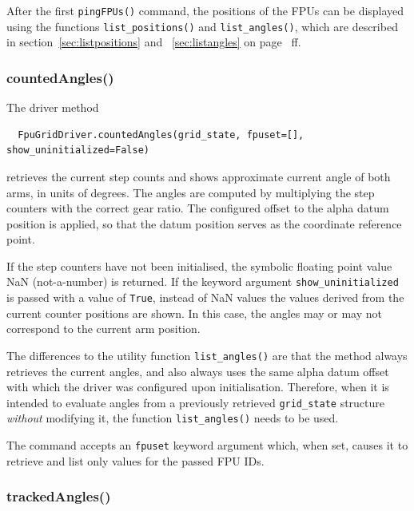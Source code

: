 \documentclass[11pt,a4paper]{report}
\begin{document}
After the first \texttt{pingFPUs()} command, the positions of the FPUs
can be displayed using the functions \texttt{list\_positions()} and
\texttt{list\_angles()}, which are described in
section~\ref{sec:listpositions} and ~\ref{sec:listangles} on
page~\pageref{sec:listpositions} ff.


\subsubsection{countedAngles()}
\label{sec:countedangles}

The driver method

\begin{verbatim}
  FpuGridDriver.countedAngles(grid_state, fpuset=[], show_uninitialized=False)
\end{verbatim}
retrieves the current step counts and shows approximate current angle
of both arms, in units of degrees. The angles are computed by
multiplying the step counters with the correct gear ratio. The
configured offset to the alpha datum position is applied, so that the
datum position serves as the coordinate reference point.

If the step counters have not been initialised, the symbolic floating
point value NaN (not-a-number) is returned.  If the keyword argument
\texttt{show\_uninitialized} is passed with a value of \texttt{True},
instead of NaN values the values derived from the current counter
positions are shown. In this case, the angles may or may not
correspond to the current arm position.

The differences to the utility function \texttt{list\_angles()} are
that the method always retrieves the current angles, and also always
uses the same alpha datum offset with which the driver was configured
upon initialisation. Therefore, when it is intended to evaluate angles
from a previously retrieved \texttt{grid\_state} structure
\emph{without} modifying it, the function \texttt{list\_angles()}
needs to be used.

The command accepts an \texttt{fpuset} keyword argument which, when
set, causes it to retrieve and list only values for the passed FPU
IDs.


\subsubsection{trackedAngles()}
\label{sec:trackedangles}
\end{document}
